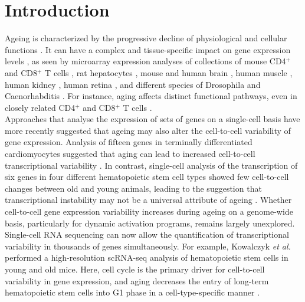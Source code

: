 
\section{Introduction}


Ageing is characterized by the progressive decline of physiological and cellular functions \citep{Lopez-Otin2013, Booth2016}. It can have a complex and tissue-specific impact on gene expression levels \citep{Zahn2007}, as seen by microarray expression analyses of collections of mouse CD4$^+$ and CD8$^+$ T cells \citep{Mirza2011}, rat hepatocytes \citep{Tollet-Egnell2000}, mouse and human brain \citep{Lu2004, Lee2000}, human muscle \citep{Welle2003, Zahn2006}, human kidney \citep{Rodwell2004}, human retina \citep{Yoshida2002}, and different species of Drosophila and Caenorhabditis \citep{Mccarroll2004}. For instance, aging affects distinct functional pathways, even in closely related CD4$^+$ and CD8$^+$ T cells \citep{Mirza2011}. \\

Approaches that analyse the expression of sets of genes on a single-cell basis have more recently suggested that ageing may also alter the cell-to-cell variability of gene expression. Analysis of fifteen genes in terminally differentiated cardiomyocytes suggested that aging can lead to increased cell-to-cell transcriptional variability \citep{Bahar2006}. In contrast, single-cell analysis of the transcription of six genes in four different hematopoietic stem cell types showed few cell-to-cell changes between old and young animals, leading to the suggestion that transcriptional instability may not be a universal attribute of ageing \citep{Warren2007}. Whether cell-to-cell gene expression variability increases during ageing on a genome-wide basis, particularly for dynamic activation programs, remains largely unexplored.\\

Single-cell RNA sequencing can now allow the quantification of transcriptional variability in thousands of genes simultaneously. For example, Kowalczyk \textit{et al.} performed a high-resolution scRNA-seq analysis of hematopoietic stem cells in young and old mice. Here, cell cycle is the primary driver for cell-to-cell variability in gene expression, and aging decreases the entry of long-term hematopoietic stem cells into G1 phase in a cell-type-specific manner \citep{Kowalczyk2015}.\\ 

